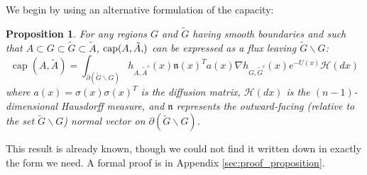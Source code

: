 \documentclass[12pt, nofootinbib,english, amsmath, amssymb, aps, priprint, graphicx,floatfix]{revtex4-1}
\newtheorem{proposition}{Proposition}
\theoremstyle{plain}
\theoremstyle{definition}
\theoremstyle{plain}
\newcommand{\normal}{{\mathfrak{n}}}
\newcommand{\capac}[2]{\ensuremath{\operatorname{cap}}(#1,#2)}
\newcommand{\hausdorffmeasure}{\mathscr{H}(dx)}
\newcommand{\tA}{{\tilde A}}
\begin{document}
We begin by using an alternative formulation of the capacity:

\begin{proposition}
\label{prop:flux}
For any regions $G$ and $\tilde{G}$ having smooth boundaries and such that $A\subset G \subset \tilde G \subset \tilde A$, $\capac{A,\tA}$ can be expressed as a flux leaving $\tilde G \backslash G$:
\begin{equation}
\label{eqn:GIntegral}
\ensuremath{\operatorname{cap}} (A, \tilde{A}) = \int_{\partial (\tilde G \backslash G)}  h_{A, \tilde{A}^c} (x)   \normal(x)^T a (x) \nabla h_{G, \tilde{G}^c} (x)e^{- U (x)} \hausdorffmeasure
\end{equation}
where $a(x)=\sigma(x)\sigma(x)^T$ is the diffusion matrix, $\hausdorffmeasure$ is the $(n-1)$-dimensional Hausdorff measure, and $\normal$ represents the outward-facing (relative to the set $\tilde G \backslash G$) normal vector on $\partial (\tilde G \backslash G)$.
\end{proposition}
\noindent This result is already known, though we could not find it written down in exactly the form we need.  A formal proof is in Appendix \ref{sec:proof_proposition}.
\end{document}
